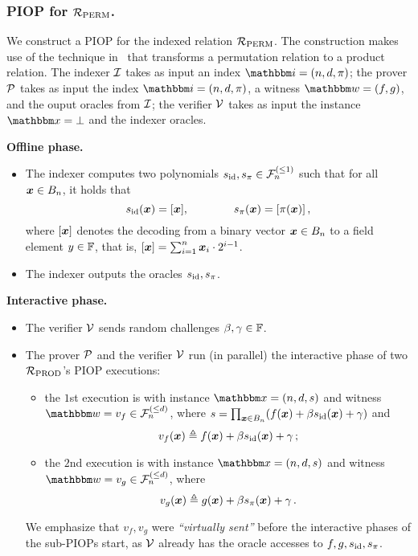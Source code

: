\subsubsection*{PIOP for ${\mathcal{R}}_{\text{PERM}}$.}
We construct a PIOP for the indexed relation ${\mathcal{R}}_{\text{PERM}}$.
The construction makes use of the technique in~\cite{GWC19} that 
transforms a permutation relation to a product relation.
The indexer $\mathcal{I}$ takes as input an index $\idxR = (n, d, \perm)$;
the prover $\mathcal{P}$ takes as input the index $\idxR = (n, d, \perm)$,
a witness $\witR = (f, g)$, and the ouput oracles from $\mathcal{I}$;
the verifier $\mathcal{V}$ takes as input the instance $\instR = \bot$ and 
the indexer oracles.

\textbf{Offline phase.}
\begin{itemize}
    \item The indexer computes two polynomials $s_{\text{id}}, s_{\pi} \in {\mathcal{F}}_{n}^{(\le{1})}$ such that
    for all $\boldsymbol{x} \in B_{n}$, it holds that 
    \[
        s_{\text{id}}(\boldsymbol{x}) = [\boldsymbol{x}], \qquad\qquad s_{\pi}(\boldsymbol{x}) = [\pi(\boldsymbol{x})]\,,
    \]
    where $[\boldsymbol{x}]$ denotes the decoding from a binary vector $\boldsymbol{x} \in B_{n}$
    to a field element $y \in \mathbb{F}$, that is, $[\boldsymbol{x}] = \sum_{i=1}^{n} \boldsymbol{x}_i \cdot 2^{i-1}$.
    \item The indexer outputs the oracles $s_{\text{id}}, s_{\pi}$.
\end{itemize}

\textbf{Interactive phase.} 
\begin{itemize}
    \item The verifier $\mathcal{V}$ sends random challenges $\beta, \gamma \in \mathbb{F}$.
    \item The prover $\mathcal{P}$ and the verifier $\mathcal{V}$ run (in parallel) the interactive phase 
    of two ${\mathcal{R}}_{\text{PROD}}$'s PIOP executions:
        \begin{itemize}
            \item the $1$st execution is with instance $\instR = (n, d, s)$ and
                witness $\witR = v_{f} \in \bdp{n}{d}$, where 
                $
                    s = \prod_{\boldsymbol{x}\in B_{n}} (f(\boldsymbol{x}) + \beta s_{\text{id}}(\boldsymbol{x}) + \gamma)
                $ and
                \[
                    v_{f}(\boldsymbol{x}) \mathrel{\triangleq} f(\boldsymbol{x}) + \beta s_{\text{id}}(\boldsymbol{x}) + \gamma \,;
                \]
            \item the $2$nd execution is with instance $\instR = (n, d, s)$ and 
                witness $\witR = v_{g} \in \bdp{n}{d}$, where 
                \[
                    v_{g}(\boldsymbol{x}) \mathrel{\triangleq} g(\boldsymbol{x}) + \beta s_{\pi}(\boldsymbol{x}) + \gamma \,.
                \]
        \end{itemize}
        We emphasize that $v_{f}, v_{g}$ were \emph{``virtually sent''} before the interactive phases of the sub-PIOPs start,
        as $\mathcal{V}$ already has the oracle accesses to $f, g, s_{\text{id}}, s_{\pi}$.
\end{itemize}

